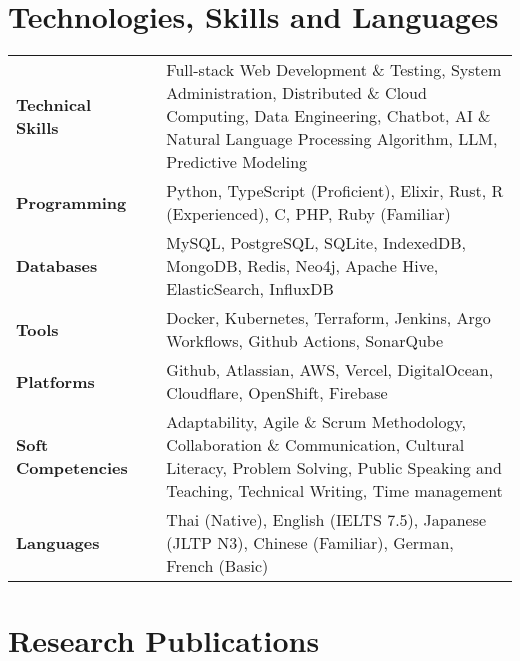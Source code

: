 \documentclass{article}
\newcommand{\hskills}[1]{
\textbf{\bfseries #1} }
\begin{document}
    \section{Technologies, Skills and Languages}
    \vspace{-0.2cm}
    \begin{tabular}{p{11em} p{1em} p{48em}}
        \hskills{Technical Skills}&  & Full-stack Web Development \& Testing, System Administration, Distributed \& Cloud Computing, \vfill
            Data Engineering, Chatbot, AI \& Natural Language Processing Algorithm, LLM, Predictive Modeling \\
        \hskills{Programming}&  & Python, TypeScript (Proficient), Elixir, Rust, R (Experienced), C, PHP, Ruby (Familiar) \\
        \hskills{Databases}&  & MySQL, PostgreSQL, SQLite, IndexedDB, MongoDB, Redis, Neo4j, Apache Hive, ElasticSearch, InfluxDB \\
        \hskills{Tools}&  & Docker, Kubernetes, Terraform, Jenkins, Argo Workflows, Github Actions, SonarQube \\
        \hskills{Platforms}&  & Github, Atlassian, AWS, Vercel, DigitalOcean, Cloudflare, OpenShift, Firebase \\
        \hskills{Soft Competencies}&  & Adaptability, Agile \& Scrum Methodology, Collaboration \& Communication, Cultural Literacy, \vfill
            Problem Solving, Public Speaking and Teaching, Technical Writing, Time management \\
        \hskills{Languages}&  & Thai (Native), English (IELTS 7.5), Japanese (JLTP N3), Chinese (Familiar), German, French (Basic) \\
    \end{tabular}

    \vspace{-0.4cm}
    \section{Research Publications} 
    \vspace{-0.2cm}
    \renewcommand\refname{\vskip -2em}
    \nocite{*}
    \printbibliography[heading=none]
    \vspace{-0.4cm}

  
\end{document}
